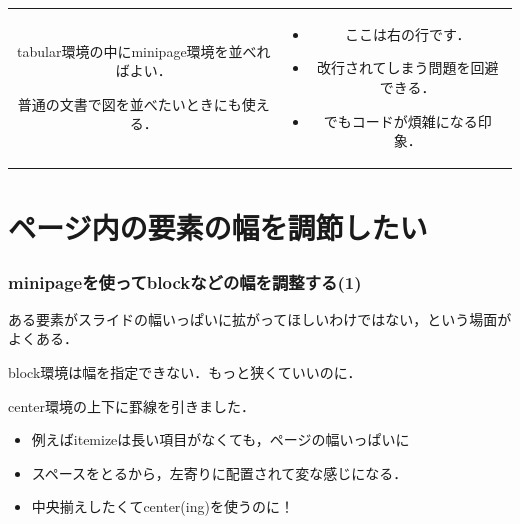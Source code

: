 \documentclass[unicode, 9pt, aspectratio=169]{beamer}
\begin{document}
\begin{frame}
\begin{center}
    \begin{tabular}{cc}
        \begin{minipage}{.5\linewidth}
            tabular環境の中にminipage環境を並べればよい．
            \begin{block}{}
                \centering
                普通の文書で図を並べたいときにも使える．
            \end{block}
        \end{minipage}
        &
        \begin{minipage}{.4\linewidth}
            \begin{itemize}
                \item ここは右の行です．
                \item 改行されてしまう問題を回避できる．
                \item でもコードが煩雑になる印象．
            \end{itemize}
        \end{minipage}
    \end{tabular}
\end{center}
\end{frame}

\section{ページ内の要素の幅を調節したい}
\begin{frame}
\frametitle{minipageを使ってblockなどの幅を調整する(1)}
ある要素がスライドの幅いっぱいに拡がってほしいわけではない，という場面がよくある．
\begin{block}{}
    \centering
    block環境は幅を指定できない．もっと狭くていいのに．
\end{block}

\hrulefill
\begin{center}
center環境の上下に罫線を引きました．
\begin{itemize}
    \item 例えばitemizeは長い項目がなくても，ページの幅いっぱいに
    \item スペースをとるから，左寄りに配置されて変な感じになる．
    \item 中央揃えしたくてcenter(ing)を使うのに！
\end{itemize}
\end{center}
\hrulefill
\end{frame}
\end{document}
